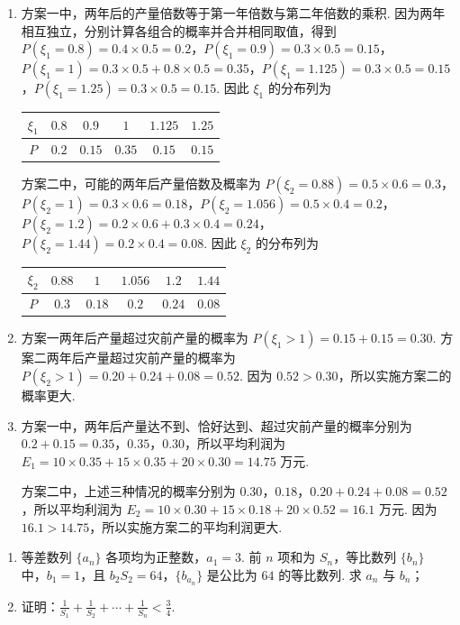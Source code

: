 \begin{solution}
\begin{enumerate}
\item 方案一中，两年后的产量倍数等于第一年倍数与第二年倍数的乘积. 因为两年相互独立，分别计算各组合的概率并合并相同取值，得到
\(P(\xi_1=0.8)=0.4\times0.5=0.2\)，\(P(\xi_1=0.9)=0.3\times0.5=0.15\)，\(P(\xi_1=1)=0.3\times0.5+0.8\times0.5=0.35\)，\(P(\xi_1=1.125)=0.3\times0.5=0.15\)，\(P(\xi_1=1.25)=0.3\times0.5=0.15\). 因此 \(\xi_1\) 的分布列为

\begin{tabular}{c|ccccc}
\(\xi_1\) & \(0.8\) & \(0.9\) & \(1\) & \(1.125\) & \(1.25\) \\
\hline
\(P\) & \(0.2\) & \(0.15\) & \(0.35\) & \(0.15\) & \(0.15\)
\end{tabular}

方案二中，可能的两年后产量倍数及概率为
\(P(\xi_2=0.88)=0.5\times0.6=0.3\)，\(P(\xi_2=1)=0.3\times0.6=0.18\)，\(P(\xi_2=1.056)=0.5\times0.4=0.2\)，\(P(\xi_2=1.2)=0.2\times0.6+0.3\times0.4=0.24\)，\(P(\xi_2=1.44)=0.2\times0.4=0.08\). 因此 \(\xi_2\) 的分布列为

\begin{tabular}{c|ccccc}
\(\xi_2\) & \(0.88\) & \(1\) & \(1.056\) & \(1.2\) & \(1.44\) \\
\hline
\(P\) & \(0.3\) & \(0.18\) & \(0.2\) & \(0.24\) & \(0.08\)
\end{tabular}

\item 方案一两年后产量超过灾前产量的概率为 \(P(\xi_1>1)=0.15+0.15=0.30\). 方案二两年后产量超过灾前产量的概率为 \(P(\xi_2>1)=0.20+0.24+0.08=0.52\). 因为 \(0.52>0.30\)，所以实施方案二的概率更大.

\item 方案一中，两年后产量达不到、恰好达到、超过灾前产量的概率分别为 \(0.2+0.15=0.35\)，\(0.35\)，\(0.30\)，所以平均利润为 \(E_1=10\times0.35+15\times0.35+20\times0.30=14.75\text{ 万元}\).

方案二中，上述三种情况的概率分别为 \(0.30\)，\(0.18\)，\(0.20+0.24+0.08=0.52\)，所以平均利润为 \(E_2=10\times0.30+15\times0.18+20\times0.52=16.1\text{ 万元}\). 因为 \(16.1>14.75\)，所以实施方案二的平均利润更大.
\end{enumerate}
\end{solution}

\begin{problem}
\begin{enumerate}
\item 等差数列 \(\{a_{n}\}\) 各项均为正整数，\(a_{1} = 3\). 前 \(n\) 项和为 \(S_{n}\)，等比数列 \(\{b_{n}\}\) 中，\(b_{1} = 1\)，且 \(b_{2}S_{2} = 64\)，\(\{b_{a_{n}}\}\) 是公比为 \(64\) 的等比数列. 求 \( a_{n} \) 与 \( b_{n} \)；
\item 证明：\(\frac{1}{S_1} + \frac{1}{S_2} + \cdots + \frac{1}{S_n} < \frac{3}{4}\).
\end{enumerate}
\end{problem}

